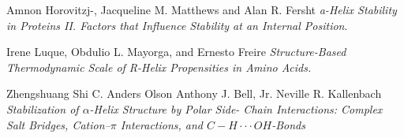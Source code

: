 \documentclass[a4paper,12pt]{article}
\begin{document}
\begin{thebibliography}{}
	  Amnon Horovitzj-, Jacqueline M. Matthews and Alan R. Fersht \textit{a-Helix Stability in Proteins II. Factors that Influence Stability at an Internal Position}. 
	
	  Irene Luque, Obdulio L. Mayorga, and Ernesto Freire
	\textit{Structure-Based Thermodynamic Scale of R-Helix Propensities in Amino Acids.}
	
	  Zhengshuang Shi C. Anders Olson Anthony J. Bell, Jr. Neville R. Kallenbach
	\textit{Stabilization of $\alpha$-Helix Structure by Polar Side- Chain Interactions: Complex Salt Bridges, Cation–$\pi$ Interactions, and $C - H \cdot \cdot \cdot O H$-Bonds} 
	

	

\end{thebibliography}
	
\end{document}
